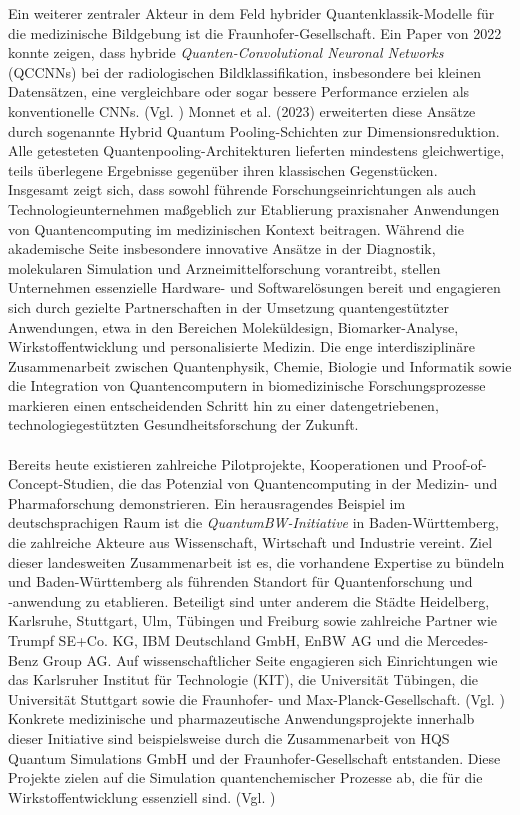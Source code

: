 Ein weiterer zentraler Akteur in dem Feld hybrider Quantenklassik-Modelle für die medizinische Bildgebung ist die Fraunhofer-Gesellschaft. Ein Paper von 2022 konnte zeigen, dass hybride \textit{Quanten-Convolutional Neuronal Networks} (QCCNNs) bei der radiologischen Bildklassifikation, insbesondere bei kleinen Datensätzen, eine vergleichbare oder sogar bessere Performance erzielen als konventionelle CNNs. (Vgl. \cite{matic_quantum-classical_2022})
Monnet et al. (2023) erweiterten diese Ansätze durch sogenannte Hybrid Quantum Pooling-Schichten zur Dimensionsreduktion. Alle getesteten Quantenpooling-Architekturen lieferten mindestens gleichwertige, teils überlegene Ergebnisse gegenüber ihren klassischen Gegenstücken.\\

Insgesamt zeigt sich, dass sowohl führende Forschungseinrichtungen als auch Technologieunternehmen maßgeblich zur Etablierung praxisnaher Anwendungen von Quantencomputing im medizinischen Kontext beitragen. Während die akademische Seite insbesondere innovative Ansätze in der Diagnostik, molekularen Simulation und Arzneimittelforschung vorantreibt, stellen Unternehmen essenzielle Hardware- und Softwarelösungen bereit und engagieren sich durch gezielte Partnerschaften in der Umsetzung quantengestützter Anwendungen, etwa in den Bereichen Moleküldesign, Biomarker-Analyse, Wirkstoffentwicklung und personalisierte Medizin. Die enge interdisziplinäre Zusammenarbeit zwischen Quantenphysik, Chemie, Biologie und Informatik sowie die Integration von Quantencomputern in biomedizinische Forschungsprozesse markieren einen entscheidenden Schritt hin zu einer datengetriebenen, technologiegestützten Gesundheitsforschung der Zukunft. \\\\


Bereits heute existieren zahlreiche Pilotprojekte, Kooperationen und Proof-of-Concept-Studien, die das Potenzial von Quantencomputing in der Medizin- und Pharmaforschung demonstrieren. Ein herausragendes Beispiel im deutschsprachigen Raum ist die \textit{QuantumBW-Initiative} in Baden-Württemberg, die zahlreiche Akteure aus Wissenschaft, Wirtschaft und Industrie vereint. Ziel dieser landesweiten Zusammenarbeit ist es, die vorhandene Expertise zu bündeln und Baden-Württemberg als führenden Standort für Quantenforschung und ‑anwendung zu etablieren. Beteiligt sind unter anderem die Städte Heidelberg, Karlsruhe, Stuttgart, Ulm, Tübingen und Freiburg sowie zahlreiche Partner wie Trumpf SE+Co. KG, IBM Deutschland GmbH, EnBW AG und die Mercedes-Benz Group AG. Auf wissenschaftlicher Seite engagieren sich Einrichtungen wie das Karlsruher Institut für Technologie (KIT), die Universität Tübingen, die Universität Stuttgart sowie die Fraunhofer- und Max-Planck-Gesellschaft. (Vgl. \cite{noauthor_partner_nodate})
Konkrete medizinische und pharmazeutische Anwendungsprojekte innerhalb dieser Initiative sind beispielsweise durch die Zusammenarbeit von HQS Quantum Simulations GmbH und der Fraunhofer-Gesellschaft entstanden. Diese Projekte zielen auf die Simulation quantenchemischer Prozesse ab, die für die Wirkstoffentwicklung essenziell sind. (Vgl. \cite{fraunhofer_iais_quantum_2023})\\

